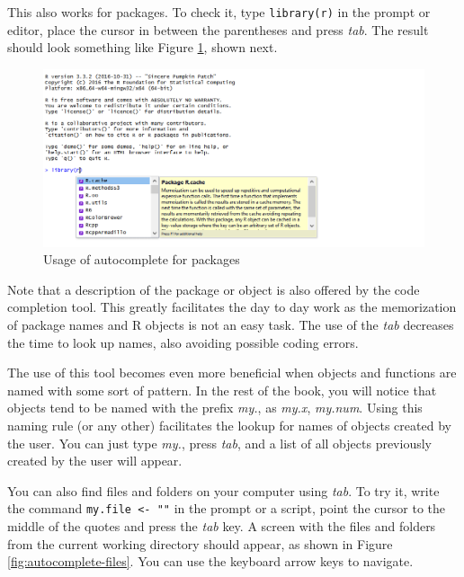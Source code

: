 \documentclass[11pt,]{book}
\begin{document}
This also works for packages. To check it, type \texttt{library(r)} in
the prompt or editor, place the cursor in between the parentheses and
press \emph{tab}. The result should look something like Figure
\ref{fig:autocomplete-packages}, shown next.

\begin{figure}[!htbp]

{\centering \includegraphics[width=1\linewidth]{figs/autocomplete_pacotes} 

}

\caption{Usage of autocomplete for packages}\label{fig:autocomplete-packages}
\end{figure}

Note that a description of the package or object is also offered by the
code completion tool. This greatly facilitates the day to day work as
the memorization of package names and R objects is not an easy task. The
use of the \emph{tab} decreases the time to look up names, also avoiding
possible coding errors.

The use of this tool becomes even more beneficial when objects and
functions are named with some sort of pattern. In the rest of the book,
you will notice that objects tend to be named with the prefix
\emph{my.}, as \emph{my.x}, \emph{my.num}. Using this naming rule (or
any other) facilitates the lookup for names of objects created by the
user. You can just type \emph{my.}, press \emph{tab}, and a list of all
objects previously created by the user will appear.

You can also find files and folders on your computer using \emph{tab}.
To try it, write the command \texttt{my.file\ \textless{}-\ ""} in the
prompt or a script, point the cursor to the middle of the quotes and
press the \emph{tab} key. A screen with the files and folders from the
current working directory should appear, as shown in Figure
\ref{fig:autocomplete-files}. You can use the keyboard arrow keys to
navigate.
\end{document}
